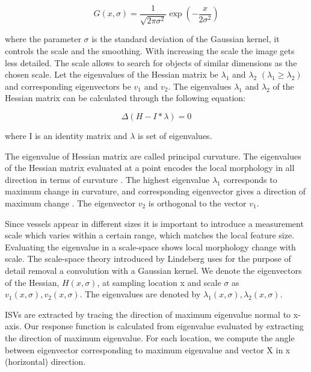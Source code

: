 \begin{equation}
G(x,\sigma) = \frac{1}{\sqrt{2\pi\sigma^2}} \exp(-\frac{x}{2\sigma^2})
\end{equation}

where the parameter $\sigma$ is the standard deviation of the Gaussian kernel, it controls the scale and the smoothing. With increasing the scale the image gets less detailed. The scale allows to search for objects of similar dimensions as  the chosen scale. Let the eigenvalues of the Hessian matrix be $\lambda_{1}$ and $\lambda_{2}$ $(\lambda_{1} \geq \lambda_{2})$ and corresponding eigenvectors be $v_{1}$ and $v_{2}$. The eigenvalues $\lambda_{1}$ and $\lambda_{2}$ of the Hessian matrix can be calculated through the following equation:

\begin{equation}
\Delta (H - I*\lambda) = 0
\end{equation}

where I is an identity matrix and $\lambda$ is set of eigenvalues.

The eigenvalue of Hessian matrix are called principal curvature. The eigenvalues of the Hessian matrix evaluated at a point encodes the local morphology in all direction in terms of curvature \cite{Descoteaux05}. The highest eigenvalue $\lambda_{1}$ corresponds to maximum change in curvature, and corresponding eigenvector gives a direction of maximum change \cite{Frangi98multiscalevessel}. The eigenvector $v_{2}$ is orthogonal to the vector $v_{1}$.  

Since vessels appear in different sizes it is important to introduce a measurement scale which varies within a certain range, which matches the local feature size. Evaluating the eigenvalue in a scale-space shows local morphology change with scale. The scale-space theory introduced by Lindeberg \cite{Lindeberg96} uses for the purpose of detail removal a convolution with a Gaussian kernel. We denote the eigenvectors of the Hessian, $H(x,\sigma)$, at sampling location x and scale $\sigma$ as $v_{1}(x,\sigma), v_{2}(x,\sigma)$. The eigenvalues are denoted by $\lambda_{1}(x,\sigma),\lambda_{2}(x,\sigma)$.

ISVs are extracted by tracing the direction of maximum eigenvalue normal to x-axis. Our response function is calculated from eigenvalue evaluated by extracting the direction of maximum eigenvalue. For each location, we compute the angle between eigenvector corresponding to maximum eigenvalue and vector X in x (horizontal) direction. 

